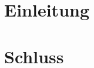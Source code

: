 \documentclass[
BCOR2.0cm,							%
]
{scrbook}
\newif\ifpdf
\begin{document}
\ifpdf
	\DeclareGraphicsExtensions{.pdf,.jpg,.png}
\else
\fi

\pagestyle{fancyplain}


\tableofcontents			%
\frontmatter					%
\chapter{Einleitung}
\mainmatter						%










\appendix							%
\chapter{Schluss}
\listoftables					%
\listoffigures				%
\end{document}
